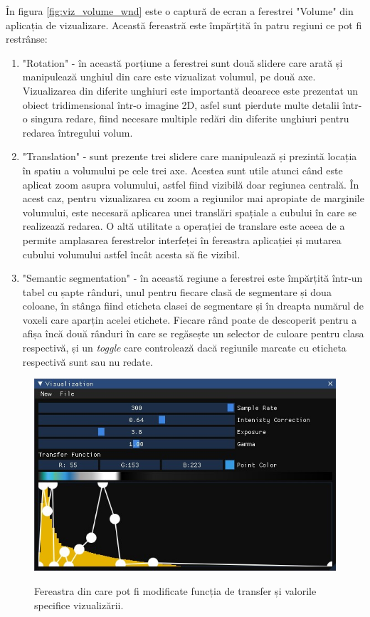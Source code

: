 În figura \ref{fig:viz_volume_wnd} este o captură de ecran a ferestrei "Volume" din aplicația de vizualizare. Această fereastră este împărțită în patru regiuni ce pot fi restrânse:
\begin{enumerate}
    \item "Rotation" - în această porțiune a ferestrei sunt două slidere care arată și manipulează unghiul din care este vizualizat volumul, pe două axe. Vizualizarea din diferite unghiuri este importantă deoarece este prezentat un obiect tridimensional într-o imagine 2D, asfel sunt pierdute multe detalii într-o singura redare, fiind necesare multiple redări din diferite unghiuri pentru redarea întregului volum.
    \item "Translation" - sunt prezente trei slidere care manipulează și prezintă locația în spatiu a volumului pe cele trei axe. Acestea sunt utile atunci când este aplicat zoom asupra volumului, astfel fiind vizibilă doar regiunea centrală. În acest caz, pentru vizualizarea cu zoom a regiunilor mai apropiate de marginile volumului, este necesară aplicarea unei translări spațiale a cubului în care se realizează redarea. O altă utilitate a operației de translare este aceea de a permite amplasarea ferestrelor interfeței în fereastra aplicației și mutarea cubului volumului astfel încât acesta să fie vizibil.
    \item "Semantic segmentation" - în această regiune a ferestrei este împărțită într-un tabel cu șapte rânduri, unul pentru fiecare clasă de segmentare și doua coloane, în stânga fiind eticheta clasei de segmentare și în dreapta numărul de voxeli care aparțin acelei etichete. Fiecare rând poate de descoperit pentru a afișa încă două rânduri în care se regăsește un selector de culoare pentru clasa respectivă, și un \textit{toggle} care controlează dacă regiunile marcate cu eticheta respectivă sunt sau nu redate.
\end{enumerate}


\begin{figure}[!h]
    \centering
    \includegraphics[width=12cm]{images/wnd_tf.jpg}
    \\
    \caption{Fereastra din care pot fi modificate funcția de transfer și valorile specifice vizualizării.}
    \label{fig:viz_tf_wnd}
\end{figure}

